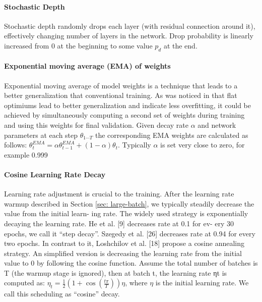 \paragraph{Stochastic Depth}

Stochastic depth \cite{huang2016_stochastic_depth} randomly drops each layer (with residual connection around it), effectively changing number of layers in the network. Drop probability is linearly increased from $0$ at the beginning to some value $p_d$ at the end.

\paragraph{Exponential moving average (EMA) of weights}

Exponential moving average of model weights \cite{izmailov2018_averaging_swa_ema} is a technique that leads to a better generalization that conventional training. As was noticed in \cite{garipov2018_loss_surfaces} that flat optimiums lead to better generalization and indicate less overfitting, it could be achieved by simultaneously computing a second set of weights during training and using this weights for final validation. Given decay rate $\alpha$ and network parameters at each step $\theta_{1 \cdots T}$ the corresponding EMA weights are calculated as follows: $\theta_{t}^{EMA} = \alpha \theta_{t-1}^{EMA} + (1 - \alpha) \theta_{t} $. Typically $\alpha$ is set very close to zero, for example 0.999 \cite{tan2021_efficientnetv2} 

\paragraph{Cosine Learning Rate Decay}

Learning rate adjustment is crucial to the training. After the learning rate warmup described in Section \ref{sec: large-batch}, we typically steadily decrease the value from the initial learn- ing rate. The widely used strategy is exponentially decaying the learning rate. He et al. [9] decreases rate at 0.1 for ev- ery 30 epochs, we call it “step decay”. Szegedy et al. [26] decreases rate at 0.94 for every two epochs.
In contrast to it, Loshchilov et al. [18] propose a cosine annealing strategy. An simplified version is decreasing the learning rate from the initial value to 0 by following the cosine function. Assume the total number of batches is T (the warmup stage is ignored), then at batch t, the learning rate ηt is computed as:
$\eta_{t}=\frac{1}{2}\left(1+\cos \left(\frac{t \pi}{T}\right)\right) \eta$, where $\eta$ is the initial learning rate. We call this scheduling as “cosine” decay.

